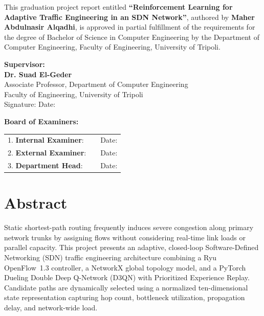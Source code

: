 \documentclass[12pt,a4paper,oneside]{report}
\begin{document}
This graduation project report entitled \textbf{``Reinforcement Learning for Adaptive Traffic Engineering in an SDN Network''}, authored by \textbf{Maher Abdulnasir Alqadhi}, is approved in partial fulfillment of the requirements for the degree of Bachelor of Science in Computer Engineering by the Department of Computer Engineering, Faculty of Engineering, University of Tripoli.

\vspace{2.0cm}

\noindent
\textbf{Supervisor:}\\[0.3cm]
\textbf{Dr. Suad El-Geder}\\
Associate Professor, Department of Computer Engineering\\
Faculty of Engineering, University of Tripoli\\[0.8cm]
Signature: \dotfill \hspace{3.0cm} Date: \dotfill

\vspace{2.0cm}

\noindent
\textbf{Board of Examiners:}\\[0.5cm]
\begin{tabularx}{\textwidth}{l X r}
1. \textbf{Internal Examiner}: & \dotfill & Date: \dotfill \\[1.2cm]
2. \textbf{External Examiner}: & \dotfill & Date: \dotfill \\[1.2cm]
3. \textbf{Department Head}: & \dotfill & Date: \dotfill \\
\end{tabularx}

\newpage

\chapter*{Abstract}

Static shortest-path routing frequently induces severe congestion along primary network trunks by assigning flows without considering real-time link loads or parallel capacity. This project presents an adaptive, closed-loop Software-Defined Networking (SDN) traffic engineering architecture combining a Ryu OpenFlow~1.3 controller, a NetworkX global topology model, and a PyTorch Dueling Double Deep Q-Network (D3QN) with Prioritized Experience Replay. Candidate paths are dynamically selected using a normalized ten-dimensional state representation capturing hop count, bottleneck utilization, propagation delay, and network-wide load.
\end{document}
